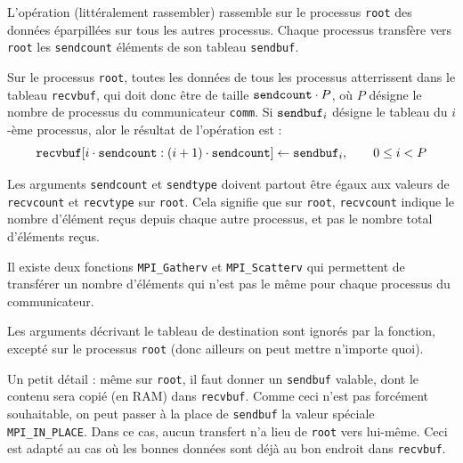 L'opération \og {}\fg (littéralement \og rassembler\fg)
rassemble sur le processus \verb|root| des données éparpillées sur
tous les autres processus. Chaque processus transfère vers \verb|root|
les \verb|sendcount| éléments de son tableau \verb|sendbuf|.

Sur le processus \verb|root|, toutes les données de tous les processus
atterrissent dans le tableau \verb|recvbuf|, qui doit donc être de taille
$\verb|sendcount| \cdot P$, où $P$ désigne le nombre de processus du
communicateur \verb|comm|. Si $\verb|sendbuf|_i$ désigne le tableau du $i$-ème
processus, alor le résultat de l'opération est :
\[
\verb|recvbuf|[i\cdot \verb|sendcount| : (i+1)\cdot \verb|sendcount|] \gets \verb|sendbuf|_i, \qquad 0 \leq i < P
\]

\begin{danger}
  Les arguments \verb|sendcount| et \verb|sendtype| doivent partout être égaux
  aux valeurs de \verb|recvcount| et \verb|recvtype| sur \verb|root|. Cela
  signifie que sur \verb|root|, \verb|recvcount| indique le nombre d'élément
  reçus depuis chaque autre processus, et pas le nombre total d'éléments reçus.
\end{danger}

\begin{ddanger}
  Il existe deux fonctions \verb|MPI_Gatherv| et \verb|MPI_Scatterv| qui
  permettent de transférer un nombre d'éléments qui n'est pas le même pour
  chaque processus du communicateur.
\end{ddanger}

Les arguments décrivant le tableau de destination sont ignorés par la fonction,
excepté sur le processus \verb|root| (donc ailleurs on peut mettre n'importe
quoi).

Un petit détail : même sur \verb|root|, il faut donner un \verb|sendbuf|
valable, dont le contenu sera copié (en RAM) dans \verb|recvbuf|. Comme ceci
n'est pas forcément souhaitable, on peut passer à la place de \verb|sendbuf| la
valeur spéciale \verb|MPI_IN_PLACE|. Dans ce cas, aucun transfert n'a lieu de
\verb|root| vers lui-même. Ceci est adapté au cas où les bonnes données sont
déjà au bon endroit dans \verb|recvbuf|.


